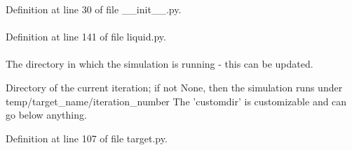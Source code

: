 \-Definition at line 30 of file \-\_\-\-\_\-init\-\_\-\-\_\-.\-py.

\hypertarget{classforcebalance_1_1liquid_1_1Liquid_a2567b4431d446cbe76e491c00ac9b6c1}{
\paragraph[{\-Ref\-Data}]{}}\label{classforcebalance_1_1liquid_1_1Liquid_a2567b4431d446cbe76e491c00ac9b6c1}


\-Definition at line 141 of file liquid.\-py.

\hypertarget{classforcebalance_1_1target_1_1Target_a1da470037ef61c22dc44beb85cfa01a9}{
\paragraph[{rundir}]{}}\label{classforcebalance_1_1target_1_1Target_a1da470037ef61c22dc44beb85cfa01a9}


\-The directory in which the simulation is running -\/ this can be updated. 

\-Directory of the current iteration; if not \-None, then the simulation runs under temp/target\-\_\-name/iteration\-\_\-number \-The 'customdir' is customizable and can go below anything.

\-Definition at line 107 of file target.\-py.

\hypertarget{classforcebalance_1_1liquid_1_1Liquid_a110998789cb046248b78318c97872930}{
\paragraph[{\-Saved\-M\-Val}]{}}\label{classforcebalance_1_1liquid_1_1Liquid_a110998789cb046248b78318c97872930}


